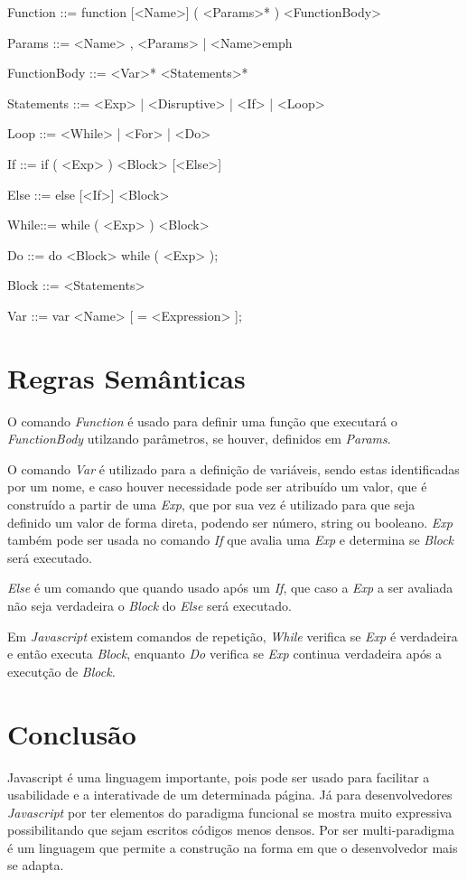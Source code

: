 \documentclass[
	article,			%
	11pt,				%
	oneside,			%
	a4paper,			%
	english,			%
	brazil,				%
	]{abntex2}
\begin{document}
        Function ::= function [<Name>] ( <Params>* ) <FunctionBody>
        
        Params ::=  <Name> , <Params> | <Name>emph  
        
        FunctionBody ::= { <Var>* <Statements>* }
        
        Statements ::= <Exp> | <Disruptive> |  <If> | <Loop>
        
        Loop ::= <While> | <For> | <Do>
        
        If ::= if ( <Exp> ) <Block> [<Else>]
        
        Else ::= else [<If>] <Block>
        
        While::= while ( <Exp> ) <Block>
        
        Do ::= do <Block> while ( <Exp> );
        
        Block ::= { <Statements> }
        
        Var ::= var <Name> [ = <Expression> ];
        
    \section{Regras Semânticas}
        O comando \emph{Function} é usado para definir uma função que executará o \emph{FunctionBody} utilzando parâmetros, se houver, definidos em \emph{Params}.
        
        O comando \emph{Var} é utilizado para a definição de variáveis, sendo estas identificadas por um nome, e caso houver necessidade pode ser atribuído um valor, que é construído a partir de uma \emph{Exp}, que por sua vez é utilizado para que seja definido um valor de forma direta, podendo ser número, string ou booleano. \emph{Exp} também pode ser usada no comando \emph{If} que avalia uma \emph{Exp} e determina se \emph{Block} será executado.
        
        \emph{Else} é um comando que quando usado após um \emph{If}, que caso a \emph{Exp} a ser avaliada não seja verdadeira o \emph{Block} do \emph{Else} será executado.
        
        Em \emph{Javascript} existem comandos de repetição, \emph{While} verifica se \emph{Exp} é verdadeira e então executa \emph{Block}, enquanto \emph{Do} verifica se \emph{Exp} continua verdadeira após a executção de \emph{Block.}
        
    \section{Conclusão}
    
    Javascript é uma linguagem importante, pois pode ser usado para facilitar a usabilidade e a interativade de um determinada página. Já para desenvolvedores \emph{Javascript} por ter elementos do paradigma funcional se mostra muito expressiva possibilitando que sejam escritos códigos menos densos. Por ser multi-paradigma é um linguagem que permite a construção na forma em que o desenvolvedor mais se adapta.
    
    
\end{document}
